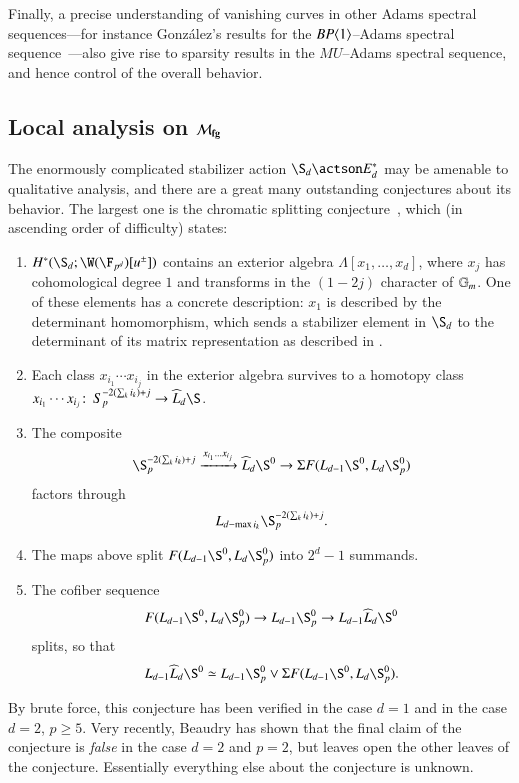 Finally, a precise understanding of vanishing curves in other Adams spectral sequences---for instance Gonz\'{a}lez's results for the $BP\langle1\rangle$--Adams spectral sequence~\cite{Gonzalez}---also give rise to sparsity results in the $MU$--Adams spectral sequence, and hence control of the overall behavior.







\subsection*{Local analysis on $\mathcal{M}_{\mathbf{fg}}$}

The enormously complicated stabilizer action $\S_d \actson E_d^*$ may be amenable to qualitative analysis, and there are a great many outstanding conjectures about its behavior.  The largest one is the chromatic splitting conjecture~\cite[Conjecture 4.2]{HoveyCSC}, which (in ascending order of difficulty) states:
\begin{enumerate}
    \item $H^*(\S_d; \W(\F_{p^d})[u^\pm])$ contains an exterior algebra $\Lambda[x_1, \ldots, x_d]$, where $x_j$ has cohomological degree $1$ and transforms in the $(1 - 2j)${\th} character of $\mathbb G_m$.  One of these elements has a concrete description: $x_1$ is described by the determinant homomorphism, which sends a stabilizer element in $\S_d$ to the determinant of its matrix representation as described in .
    \item Each class $x_{i_1} \cdots x_{i_j}$ in the exterior algebra survives to a homotopy class $x_{i_1} \cdots x_{i_j}\co S_p^{-2(\sum_k i_k)+j} \to \widehat L_d \S$.
    \item The composite \[\S_p^{-2(\sum_k i_k)+j} \xrightarrow{x_{i_1} \ldots x_{i_j}} \widehat L_d \S^0 \to \Susp F(L_{d-1} \S^0, L_d \S_p^0)\] factors through \[L_{d - \max i_k} \S_p^{-2(\sum_k i_k)+j}.\]
    \item The maps above split $F(L_{d-1} \S^0, L_d \S^0_p)$ into $2^d-1$ summands.
    \item The cofiber sequence \[F(L_{d-1} \S^0, L_d \S^0_p) \to L_{d-1} \S^0_p \to L_{d-1} \widehat L_d \S^0\] splits, so that \[L_{d-1} \widehat L_d \S^0 \simeq L_{d-1} \S^0_p \vee \Susp F(L_{d-1} \S^0, L_d \S^0_p).\]
\end{enumerate}
By brute force, this conjecture has been verified in the case $d = 1$ and in the case $d = 2$, $p \ge 5$.  Very recently, Beaudry has shown that the final claim of the conjecture is \emph{false} in the case $d = 2$ and $p = 2$, but leaves open the other leaves of the conjecture.  Essentially everything else about the conjecture is unknown.

